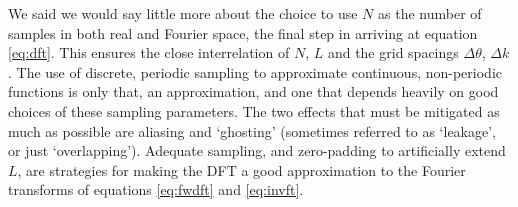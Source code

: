 \documentclass[preprint]{aastex}
\begin{document}
We said we would say little more about the choice to use $N$ as the
number of samples in both real and Fourier space, the final step in
arriving at equation \eqref{eq:dft}.  This ensures the
close interrelation of $N$, $L$ and the grid spacings $\Delta \theta$,
$\Delta k$.  The use of discrete, periodic sampling to approximate
continuous, non-periodic functions is only that, an approximation, and
one that depends heavily on good choices of these sampling
parameters.  The two effects that must be mitigated as much as
possible are aliasing and `ghosting' (sometimes referred to as
`leakage', or just `overlapping').  Adequate sampling, and
zero-padding to artificially extend $L$, are strategies for making the
DFT a good approximation to the Fourier transforms of equations
\eqref{eq:fwdft} and \eqref{eq:invft}.
\end{document}
